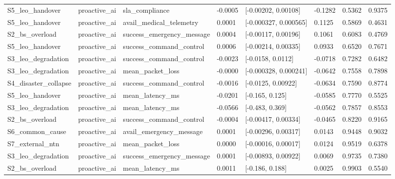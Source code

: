 \begin{tabular}{llllllll}
S5\_leo\_handover & proactive\_ai & sla\_compliance & -0.0005 & [-0.00202, 0.00108] & -0.1282 & 0.5362 & 0.9375 \\
S5\_leo\_handover & proactive\_ai & avail\_medical\_telemetry & 0.0001 & [-0.000327, 0.000565] & 0.1125 & 0.5869 & 0.4631 \\
S2\_bs\_overload & proactive\_ai & success\_emergency\_message & 0.0004 & [-0.00117, 0.00196] & 0.1061 & 0.6083 & 0.4769 \\
S5\_leo\_handover & proactive\_ai & success\_command\_control & 0.0006 & [-0.00214, 0.00335] & 0.0933 & 0.6520 & 0.7671 \\
S3\_leo\_degradation & proactive\_ai & success\_command\_control & -0.0023 & [-0.0158, 0.0112] & -0.0718 & 0.7282 & 0.6482 \\
S3\_leo\_degradation & proactive\_ai & mean\_packet\_loss & -0.0000 & [-0.000328, 0.000241] & -0.0642 & 0.7558 & 0.7898 \\
S4\_disaster\_collapse & proactive\_ai & success\_command\_control & -0.0016 & [-0.0125, 0.00922] & -0.0634 & 0.7590 & 0.8774 \\
S5\_leo\_handover & proactive\_ai & mean\_latency\_ms & -0.0201 & [-0.165, 0.125] & -0.0585 & 0.7770 & 0.5525 \\
S3\_leo\_degradation & proactive\_ai & mean\_latency\_ms & -0.0566 & [-0.483, 0.369] & -0.0562 & 0.7857 & 0.8553 \\
S2\_bs\_overload & proactive\_ai & success\_command\_control & -0.0004 & [-0.00417, 0.00334] & -0.0465 & 0.8220 & 0.9165 \\
S6\_common\_cause & proactive\_ai & avail\_emergency\_message & 0.0001 & [-0.00296, 0.00317] & 0.0143 & 0.9448 & 0.9032 \\
S7\_external\_ntn & proactive\_ai & mean\_packet\_loss & 0.0000 & [-0.00016, 0.00017] & 0.0124 & 0.9519 & 0.6378 \\
S3\_leo\_degradation & proactive\_ai & success\_emergency\_message & 0.0001 & [-0.00893, 0.00922] & 0.0069 & 0.9735 & 0.7380 \\
S2\_bs\_overload & proactive\_ai & mean\_latency\_ms & 0.0011 & [-0.186, 0.188] & 0.0025 & 0.9903 & 0.5540 \\
\bottomrule
\end{tabular}
